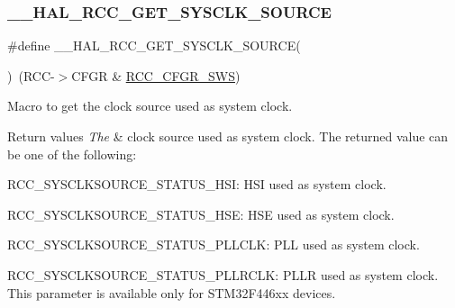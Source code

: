 \subsubsection{\texorpdfstring{\+\_\+\+\_\+\+H\+A\+L\+\_\+\+R\+C\+C\+\_\+\+G\+E\+T\+\_\+\+S\+Y\+S\+C\+L\+K\+\_\+\+S\+O\+U\+R\+CE}{\_\_HAL\_RCC\_GET\_SYSCLK\_SOURCE}}
{\footnotesize\ttfamily \#define \+\_\+\+\_\+\+H\+A\+L\+\_\+\+R\+C\+C\+\_\+\+G\+E\+T\+\_\+\+S\+Y\+S\+C\+L\+K\+\_\+\+S\+O\+U\+R\+CE(\begin{DoxyParamCaption}{ }\end{DoxyParamCaption})~(R\+CC-\/$>$C\+F\+GR \& \mbox{\hyperlink{group___peripheral___registers___bits___definition_ga15bf2269500dc97e137315f44aa015c9}{R\+C\+C\+\_\+\+C\+F\+G\+R\+\_\+\+S\+WS}})}



Macro to get the clock source used as system clock. 


\begin{DoxyRetVals}{Return values}
{\em The} & clock source used as system clock. The returned value can be one of the following\+:
\begin{DoxyItemize}
\item R\+C\+C\+\_\+\+S\+Y\+S\+C\+L\+K\+S\+O\+U\+R\+C\+E\+\_\+\+S\+T\+A\+T\+U\+S\+\_\+\+H\+SI\+: H\+SI used as system clock.
\item R\+C\+C\+\_\+\+S\+Y\+S\+C\+L\+K\+S\+O\+U\+R\+C\+E\+\_\+\+S\+T\+A\+T\+U\+S\+\_\+\+H\+SE\+: H\+SE used as system clock.
\item R\+C\+C\+\_\+\+S\+Y\+S\+C\+L\+K\+S\+O\+U\+R\+C\+E\+\_\+\+S\+T\+A\+T\+U\+S\+\_\+\+P\+L\+L\+C\+LK\+: P\+LL used as system clock.
\item R\+C\+C\+\_\+\+S\+Y\+S\+C\+L\+K\+S\+O\+U\+R\+C\+E\+\_\+\+S\+T\+A\+T\+U\+S\+\_\+\+P\+L\+L\+R\+C\+LK\+: P\+L\+LR used as system clock. This parameter is available only for S\+T\+M32\+F446xx devices. 
\end{DoxyItemize}\\
\hline
\end{DoxyRetVals}
\mbox{\label{group___r_c_c___get___clock__source_ga32f72b8c5b7e97b415867c57f9fafed6}} 

